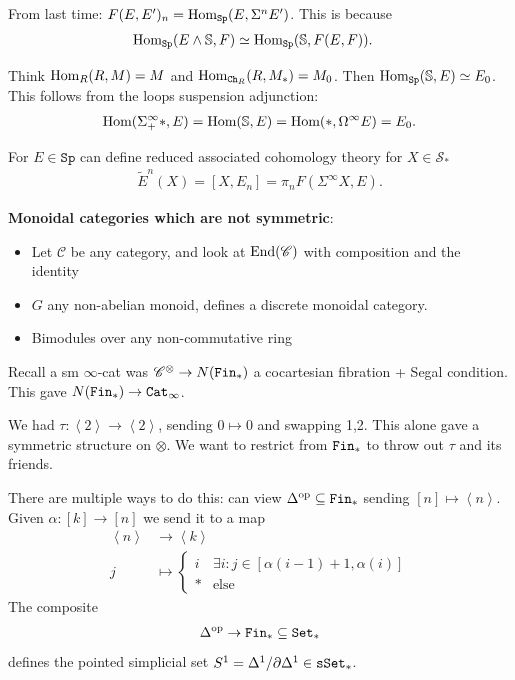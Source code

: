 \documentclass[12pt]{amsart}
\let\til\widetilde
\theoremstyle{definition}
\let\del\partial
\let\smashprod\wedge
\providecommand{\Sp}{\texttt{Sp}}
\providecommand{\Sp}{\text{Sp}}
\begin{document}
From last time: $F(E,E')_n = \Hom_\Sp(E, \Sigma^n E')$. This is because
\begin{align*}
    \Hom_\Sp(E \smashprod \mathbb{S}, F) &\simeq \Hom_\Sp(\mathbb{S},F(E,F)).
\end{align*}

Think $\text{Hom}_R(R,M) = M$ and $\text{Hom}_{\texttt{Ch}_R}(R,M_\ast) = M_0$. Then $\Hom_\Sp(\mathbb{S},E) \simeq E_0$. This follows from the loops suspension adjunction:
\begin{align*}
    \text{Hom}(\Sigma^\infty_+ \ast, E) = \text{Hom}(\mathbb{S},E) = \text{Hom}(\ast, \Omega^\infty E) = E_0.
\end{align*}

For $E\in \Sp$ can define reduced associated cohomology theory for $X \in \mathcal{S}_\ast$
\begin{align*}
    \til{E}^n(X) = \left[ X, E_n \right] = \pi_n F(\Sigma^\infty X, E).
\end{align*}

\textbf{Monoidal categories which are not symmetric}:
\begin{itemize}
    \item Let $\mathscr{C}$ be any category, and look at $\text{End}(\mathscr{C})$ with composition and the identity
    \item $G$ any non-abelian monoid, defines a discrete monoidal category.
    \item Bimodules over any non-commutative ring
\end{itemize}

Recall a sm $\infty$-cat was $\mathscr{C}^\otimes \to N(\texttt{Fin}_\ast)$ a cocartesian fibration + Segal condition. This gave $N(\texttt{Fin}_\ast) \to \texttt{Cat}_\infty$.

We had $\tau: \left\langle 2 \right\rangle \to \left\langle 2 \right\rangle$, sending $0\mapsto 0$ and swapping 1,2. This alone gave a symmetric structure on $\otimes$. We want to restrict from $\texttt{Fin}_\ast$ to throw out $\tau$ and its friends.

There are multiple ways to do this: can view $\Delta^{\text{op}} \subseteq \texttt{Fin}_\ast$ sending $[n]\mapsto \left\langle n \right\rangle$. Given $\alpha: [k] \to [n]$ we send it to a map
\begin{align*}
    \left\langle n \right\rangle &\to \left\langle k \right\rangle \\
    j &\mapsto \begin{cases} i & \exists i \colon j\in [\alpha(i-1)+1,\alpha(i)] \\ \ast & \text{else} \end{cases}
\end{align*}
The composite
\begin{align*}
    \Delta^{\text{op}} \to \texttt{Fin}_\ast \subseteq \texttt{Set}_\ast
\end{align*}
defines the pointed simplicial set $S^1 = \Delta^1/\del \Delta^1 \in \sSet_\ast$.
\end{document}
